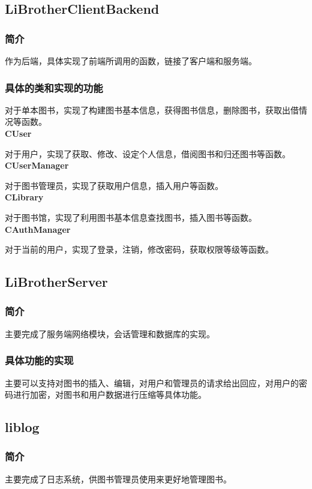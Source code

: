 \documentclass[UTF8]{ctexart}
\begin{document}
\subsection{LiBrotherClientBackend}
\subsubsection{简介}
作为后端，具体实现了前端所调用的函数，链接了客户端和服务端。\\
\subsubsection{具体的类和实现的功能}

对于单本图书，实现了构建图书基本信息，获得图书信息，删除图书，获取出借情况等函数。\\
\textbf{CUser}

对于用户，实现了获取、修改、设定个人信息，借阅图书和归还图书等函数。\\
\textbf{CUserManager}

对于图书管理员，实现了获取用户信息，插入用户等函数。\\
\textbf{CLibrary}

对于图书馆，实现了利用图书基本信息查找图书，插入图书等函数。\\
\textbf{CAuthManager}

对于当前的用户，实现了登录，注销，修改密码，获取权限等级等函数。\\
\subsection{LiBrotherServer}
\subsubsection{简介}
主要完成了服务端网络模块，会话管理和数据库的实现。
\subsubsection{具体功能的实现}
主要可以支持对图书的插入、编辑，对用户和管理员的请求给出回应，对用户的密码进行加密，对图书和用户数据进行压缩等具体功能。
\subsection{liblog}
\subsubsection{简介}
主要完成了日志系统，供图书管理员使用来更好地管理图书。
\end{document}
